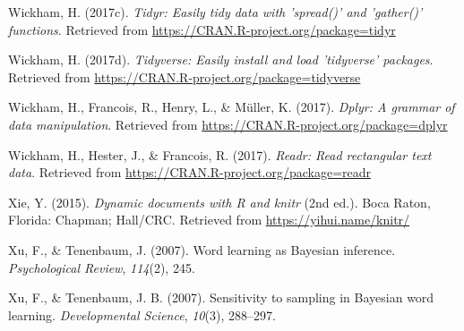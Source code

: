 \documentclass[english,floatsintext,man]{apa6}
\theoremstyle{definition}
\theoremstyle{definition}
\theoremstyle{remark}
\begin{document}
\hypertarget{ref-R-tidyr}{}
Wickham, H. (2017c). \emph{Tidyr: Easily tidy data with 'spread()' and
'gather()' functions}. Retrieved from
\url{https://CRAN.R-project.org/package=tidyr}

\hypertarget{ref-R-tidyverse}{}
Wickham, H. (2017d). \emph{Tidyverse: Easily install and load
'tidyverse' packages}. Retrieved from
\url{https://CRAN.R-project.org/package=tidyverse}

\hypertarget{ref-R-dplyr}{}
Wickham, H., Francois, R., Henry, L., \& Müller, K. (2017). \emph{Dplyr:
A grammar of data manipulation}. Retrieved from
\url{https://CRAN.R-project.org/package=dplyr}

\hypertarget{ref-R-readr}{}
Wickham, H., Hester, J., \& Francois, R. (2017). \emph{Readr: Read
rectangular text data}. Retrieved from
\url{https://CRAN.R-project.org/package=readr}

\hypertarget{ref-R-knitr}{}
Xie, Y. (2015). \emph{Dynamic documents with R and knitr} (2nd ed.).
Boca Raton, Florida: Chapman; Hall/CRC. Retrieved from
\url{https://yihui.name/knitr/}

\hypertarget{ref-xu2007word}{}
Xu, F., \& Tenenbaum, J. (2007). Word learning as Bayesian inference.
\emph{Psychological Review}, \emph{114}(2), 245.

\hypertarget{ref-xu2007}{}
Xu, F., \& Tenenbaum, J. B. (2007). Sensitivity to sampling in Bayesian
word learning. \emph{Developmental Science}, \emph{10}(3), 288--297.
\end{document}
